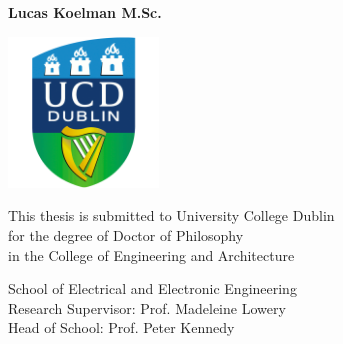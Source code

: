 \makeatletter
\begin{titlepage}
\begin{center}

\vspace*{1cm}

\Huge
\textbf{\@title}

\vspace{0.5cm}
\LARGE

\vspace{6mm}

\LARGE
\textbf{Lucas Koelman M.Sc.}

\vspace{12mm}

\includegraphics[width=0.3\textwidth]{ch_frontmatter/ucd_logo.png}

\vspace{8mm}

\normalsize
This thesis is submitted to University College Dublin\\
for the degree of Doctor of Philosophy\\
in the College of Engineering and Architecture\\

\vspace{6mm}

\LARGE
\@date

\vspace{6mm}

\large
School of Electrical and Electronic Engineering\\
Research Supervisor:   Prof. Madeleine Lowery\\
Head of School:        Prof. Peter Kennedy


\end{center}
\end{titlepage}
\makeatother

